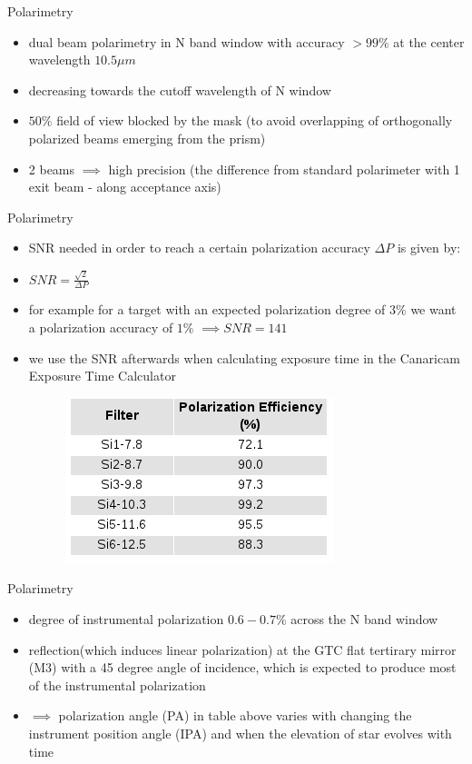 \documentclass{beamer}
\begin{document}
\begin{frame}{Polarimetry}



\begin{itemize}
\item dual beam polarimetry  in N band window with accuracy $> 99\%$ at the center wavelength $10.5 \mu m$
\item decreasing towards the cutoff wavelength of N window
\item $50\%$ field of view blocked by the mask (to avoid overlapping of orthogonally polarized beams emerging from the prism)
\item 2 beams $\implies$ high precision (the difference from standard polarimeter with 1 exit beam - along acceptance axis)
\end{itemize}
\end{frame}

\begin{frame}{Polarimetry}
\begin{itemize}
\item SNR needed in order to reach a certain polarization accuracy $\Delta P$ is given by:
\item $SNR = \frac{\sqrt{2}}{\Delta P}$
\item for example for a target with an expected polarization degree of $3\%$ we want a polarization accuracy of $1\%$ 
$\implies SNR = 141$
\item we use the SNR afterwards  when  calculating exposure time in the Canaricam Exposure Time Calculator
\begin{figure}[H]
 \centering
 \includegraphics[scale=0.4]{img3.png}
\end{figure}
\end{itemize}
\end{frame}


\begin{frame}{Polarimetry}
\begin{itemize}
\item degree of instrumental polarization $0.6- 0.7\%$ across the N band window
\item reflection(which induces linear polarization) at the GTC flat tertirary mirror (M3) with a 45 degree angle of incidence, 
which is expected to produce most of the instrumental polarization
\item $\implies $ polarization angle (PA) in table above varies with changing the instrument position angle (IPA) and 
when the elevation of star evolves with time
\end{itemize}
\end{frame}
\end{document}
